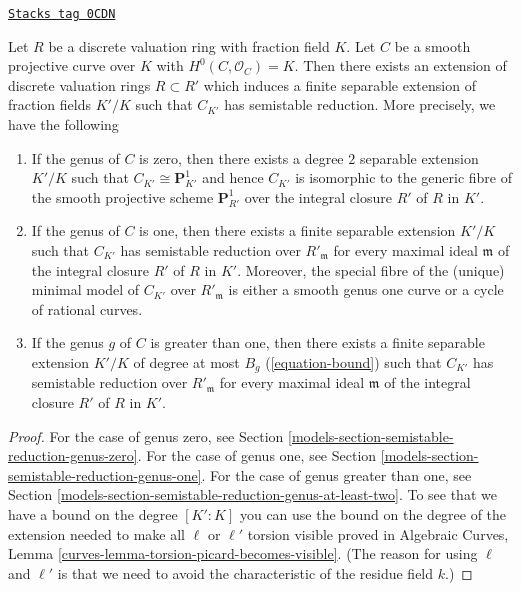 \begin{theorem}
\label{models-theorem-semistable-reduction}
\href{https://stacks.math.columbia.edu/tag/0CDN}{\texttt{Stacks tag 0CDN}}

\begin{reference}
\cite[Corollary 2.7]{DM}
\end{reference}
Let $R$ be a discrete valuation ring with fraction field $K$. Let $C$ be a
smooth projective curve over $K$ with $H^0(C, \mathcal{O}_C) = K$.
Then there exists an extension of discrete valuation rings
$R \subset R'$ which induces a finite separable extension of
fraction fields $K'/K$ such that $C_{K'}$ has semistable reduction.
More precisely, we have the following
\begin{enumerate}
\item If the genus of $C$ is zero, then there exists a degree $2$
separable extension $K'/K$ such that $C_{K'} \cong \mathbf{P}^1_{K'}$
and hence $C_{K'}$ is isomorphic to the generic fibre of the
smooth projective scheme $\mathbf{P}^1_{R'}$ over the integral closure
$R'$ of $R$ in $K'$.
\item If the genus of $C$ is one, then there exists a finite separable
extension $K'/K$ such that $C_{K'}$ has semistable reduction
over $R'_\mathfrak m$ for every maximal ideal $\mathfrak m$
of the integral closure $R'$ of $R$ in $K'$. Moreover, the special
fibre of the (unique) minimal model of $C_{K'}$ over $R'_\mathfrak m$
is either a smooth genus one curve or a cycle of rational curves.
\item If the genus $g$ of $C$ is greater than one, then there exists a
finite separable extension $K'/K$ of degree at most
$B_g$ (\ref{equation-bound}) such that $C_{K'}$ has semistable reduction
over $R'_\mathfrak m$ for every maximal ideal $\mathfrak m$
of the integral closure $R'$ of $R$ in $K'$.
\end{enumerate}
\end{theorem}

\begin{proof}
For the case of genus zero, see
Section \ref{models-section-semistable-reduction-genus-zero}.
For the case of genus one, see
Section \ref{models-section-semistable-reduction-genus-one}.
For the case of genus greater than one, see
Section \ref{models-section-semistable-reduction-genus-at-least-two}.
To see that we have a bound on the degree $[K' : K]$
you can use the bound on the degree of the extension needed
to make all $\ell$ or $\ell'$ torsion visible proved in
Algebraic Curves, Lemma \ref{curves-lemma-torsion-picard-becomes-visible}.
(The reason for using $\ell$ and $\ell'$ is that we need to
avoid the characteristic of the residue field $k$.)
\end{proof}

